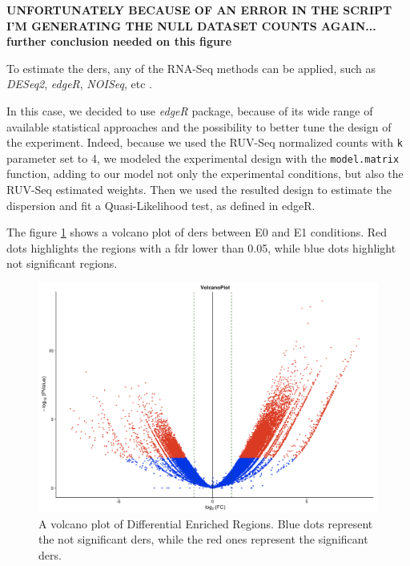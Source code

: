 \textbf{UNFORTUNATELY BECAUSE OF AN ERROR IN THE SCRIPT I'M GENERATING THE NULL DATASET COUNTS AGAIN... further conclusion needed on this figure}

To estimate the \glspl{der}, any of the RNA-Seq methods can be applied, such as \textit{DESeq2}, \textit{edgeR}, \textit{NOISeq}, etc \cite{Robinson2009, McCarthy2012, Tarazona2012}.

In this case, we decided to use \textit{edgeR} package, because of its wide range of  available statistical approaches and the possibility to better tune the design of the experiment. 
Indeed, because we used the RUV-Seq normalized counts with \lstinline!k! parameter set to 4, we modeled the experimental design with the \lstinline!model.matrix! function, adding to our model not only the experimental conditions, but also the RUV-Seq estimated weights.
Then we used the resulted design to estimate the dispersion and fit a Quasi-Likelihood test, as defined in edgeR.

The figure \ref{fig:depeaksdescan} shows a volcano plot of \glspl{der} between E0 and E1 conditions.
Red dots highlights the regions with a \gls{fdr}\cite{Benjamini1995} lower than 0.05, while blue dots highlight not significant regions.
 
\begin{figure}[H]
\centering
\includegraphics[width=\textwidth, height=\textheight, keepaspectratio]{img/descan2/DE_peaks.png}
\caption[Differential Enrichment Regions Volcano]{A volcano plot of Differential Enriched Regions. Blue dots represent the not significant \glspl{der}, while the red ones represent the significant \glspl{der}.}
\label{fig:depeaksdescan}
\centering
\end{figure}

